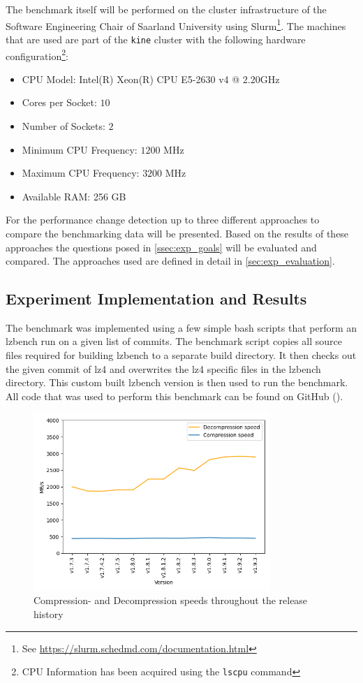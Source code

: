 \documentclass[	runningheads,
				a4paper]{llncs}
\begin{document}
The benchmark itself will be performed on the cluster infrastructure of the Software Engineering Chair of Saarland University using Slurm\footnote{See \url{https://slurm.schedmd.com/documentation.html}}. The machines that are used are part of the \texttt{kine} cluster with the following hardware configuration\footnote{CPU Information has been acquired using the \texttt{lscpu} command}:

\begin{itemize}
	\item CPU Model: Intel(R) Xeon(R) CPU E5-2630 v4 @ 2.20GHz
	\item Cores per Socket: $10$
	\item Number of Sockets: $2$
	\item Minimum CPU Frequency: $1200$ MHz
	\item Maximum CPU Frequency: $3200$ MHz
	\item Available RAM: 256 GB
\end{itemize}

For the performance change detection up to three different approaches to compare the benchmarking data will be presented. Based on the results of these approaches the questions posed in \autoref{ssec:exp_goals} will be evaluated and compared. The approaches used are defined in detail in \autoref{sec:exp_evaluation}.

	\subsection{Experiment Implementation and Results}

	The benchmark was implemented using a few simple bash scripts that perform an lzbench run on a given list of commits. The benchmark script copies all source files required for building lzbench to a separate build directory. It then checks out the given commit of lz4 and overwrites the lz4 specific files in the lzbench directory. This custom built lzbench version is then used to run the benchmark. All code that was used to perform this benchmark can be found on GitHub (\cite{TODO}).

	\begin{figure}[ht!]
		\centering
		\includegraphics[width=0.8\textwidth]{graph/lz4_releases_plot}
		\caption{Compression- and Decompression speeds throughout the release history}
		\label{fig:release-bench}
	\end{figure}
\end{document}
